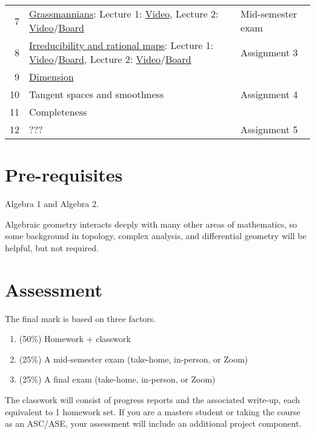 \documentclass[11pt]{article}
\begin{document}
\begin{center}
\begin{tabular}{rll}
7 & \href{classwork07.pdf}{Grassmannians}: Lecture 1: \href{https://web.microsoftstream.com/video/515cea51-64d5-445d-aaaa-6526765b021c?list=studio}{Video}, Lecture 2: \href{https://web.microsoftstream.com/video/beb6fe34-c764-4c09-92c2-93edd85f7861}{Video}/\href{notes/2021-09-24.pdf}{Board} & Mid-semester exam\\
8 & \href{classwork08.pdf}{Irreducibility and rational maps}: Lecture 1: \href{https://web.microsoftstream.com/video/5bb2a527-c57a-4ef4-a3dd-0106216db85f}{Video}/\href{notes/2021-09-27.pdf}{Board}, Lecture 2: \href{https://web.microsoftstream.com/video/09931dad-b242-415a-b602-f73895fb437e}{Video}/\href{notes/2021-10-01.pdf}{Board} & Assignment 3\\
9 & \href{classwork09.pdf}{Dimension} & \\
10 & Tangent spaces and smoothness & Assignment 4\\
11 & Completeness & \\
12 & ??? & Assignment 5\\
\hline
\end{tabular}
\end{center}

\section{Pre-requisites}
\label{sec:orgca337a4}
Algebra 1 and Algebra 2.

Algebraic geometry interacts deeply with many other areas of mathematics, so some background in topology, complex analysis, and differential geometry will be helpful, but not required. 

\section{Assessment}
\label{sec:org160f9aa}
The final mark is based on three factors.
\begin{enumerate}
\item (50\%) Homework + classwork
\item (25\%) A mid-semester exam (take-home, in-person, or Zoom)
\item (25\%) A final exam (take-home, in-person, or Zoom)
\end{enumerate}
The classwork will consist of progress reports and the associated write-up, each equivalent to 1 homework set.
If you are a masters student or taking the course as an ASC/ASE, your assessment will include an additional project component.
\end{document}
